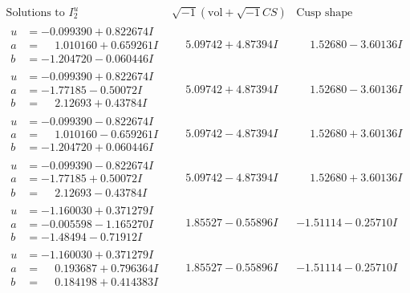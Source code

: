 \documentclass[1p]{elsarticle_modified}
\theoremstyle{definition}
\newcommand{\I}{\sqrt{-1}}
\begin{document}
$$\begin{array}{c|c|c}  
\text{Solutions to }I^u_{2}& \I (\text{vol} + \sqrt{-1}CS) & \text{Cusp shape}\\
 \hline 
\begin{aligned}
u &= -0.099390 + 0.822674 I \\
a &= \phantom{-}1.010160 + 0.659261 I \\
b &= -1.204720 - 0.060446 I\end{aligned}
 & \phantom{-}5.09742 + 4.87394 I & \phantom{-}1.52680 - 3.60136 I \\ \hline\begin{aligned}
u &= -0.099390 + 0.822674 I \\
a &= -1.77185 - 0.50072 I \\
b &= \phantom{-}2.12693 + 0.43784 I\end{aligned}
 & \phantom{-}5.09742 + 4.87394 I & \phantom{-}1.52680 - 3.60136 I \\ \hline\begin{aligned}
u &= -0.099390 - 0.822674 I \\
a &= \phantom{-}1.010160 - 0.659261 I \\
b &= -1.204720 + 0.060446 I\end{aligned}
 & \phantom{-}5.09742 - 4.87394 I & \phantom{-}1.52680 + 3.60136 I \\ \hline\begin{aligned}
u &= -0.099390 - 0.822674 I \\
a &= -1.77185 + 0.50072 I \\
b &= \phantom{-}2.12693 - 0.43784 I\end{aligned}
 & \phantom{-}5.09742 - 4.87394 I & \phantom{-}1.52680 + 3.60136 I \\ \hline\begin{aligned}
u &= -1.160030 + 0.371279 I \\
a &= -0.005598 - 1.165270 I \\
b &= -1.48494 - 0.71912 I\end{aligned}
 & \phantom{-}1.85527 - 0.55896 I & -1.51114 - 0.25710 I \\ \hline\begin{aligned}
u &= -1.160030 + 0.371279 I \\
a &= \phantom{-}0.193687 + 0.796364 I \\
b &= \phantom{-}0.184198 + 0.414383 I\end{aligned}
 & \phantom{-}1.85527 - 0.55896 I & -1.51114 - 0.25710 I \\ \hline\begin{aligned}

\end{aligned}
\end{array}$$
\end{document}
